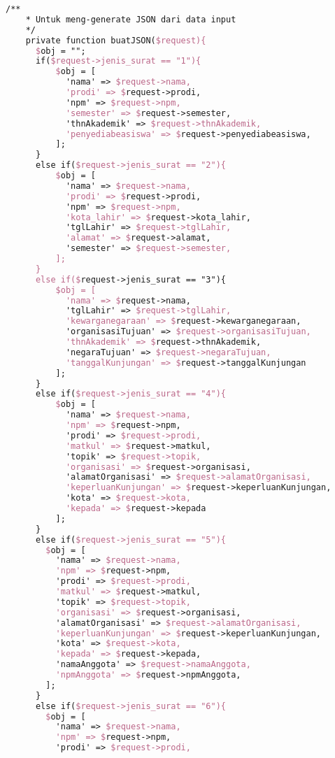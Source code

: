\begin{lstlisting}[language=tex,basicstyle=\tiny,caption=PesanansuratController.php]
    /**
    * Untuk meng-generate JSON dari data input
    */
    private function buatJSON($request){
      $obj = "";
      if($request->jenis_surat == "1"){
          $obj = [
            'nama' => $request->nama,
            'prodi' => $request->prodi,
            'npm' => $request->npm,
            'semester' => $request->semester,
            'thnAkademik' => $request->thnAkademik,
            'penyediabeasiswa' => $request->penyediabeasiswa,
          ];
      }
      else if($request->jenis_surat == "2"){
          $obj = [
            'nama' => $request->nama,
            'prodi' => $request->prodi,
            'npm' => $request->npm,
            'kota_lahir' => $request->kota_lahir,
            'tglLahir' => $request->tglLahir,
            'alamat' => $request->alamat,
            'semester' => $request->semester,
          ];
      }
      else if($request->jenis_surat == "3"){
          $obj = [
            'nama' => $request->nama,
            'tglLahir' => $request->tglLahir,
            'kewarganegaraan' => $request->kewarganegaraan,
            'organisasiTujuan' => $request->organisasiTujuan,
            'thnAkademik' => $request->thnAkademik,
            'negaraTujuan' => $request->negaraTujuan,
            'tanggalKunjungan' => $request->tanggalKunjungan
          ];
      }
      else if($request->jenis_surat == "4"){
          $obj = [
            'nama' => $request->nama,
            'npm' => $request->npm,
            'prodi' => $request->prodi,
            'matkul' => $request->matkul,
            'topik' => $request->topik,
            'organisasi' => $request->organisasi,
            'alamatOrganisasi' => $request->alamatOrganisasi,
            'keperluanKunjungan' => $request->keperluanKunjungan,
            'kota' => $request->kota,
            'kepada' => $request->kepada
          ];
      }
      else if($request->jenis_surat == "5"){
        $obj = [
          'nama' => $request->nama,
          'npm' => $request->npm,
          'prodi' => $request->prodi,
          'matkul' => $request->matkul,
          'topik' => $request->topik,
          'organisasi' => $request->organisasi,
          'alamatOrganisasi' => $request->alamatOrganisasi,
          'keperluanKunjungan' => $request->keperluanKunjungan,
          'kota' => $request->kota,
          'kepada' => $request->kepada,
          'namaAnggota' => $request->namaAnggota,
          'npmAnggota' => $request->npmAnggota,
        ];
      }
      else if($request->jenis_surat == "6"){
        $obj = [
          'nama' => $request->nama,
          'npm' => $request->npm,
          'prodi' => $request->prodi,

\end{lstlisting}
